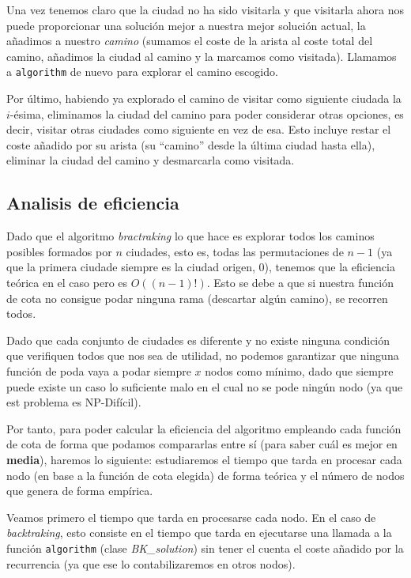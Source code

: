 \documentclass{article}
\begin{document}


Una vez tenemos claro que la ciudad no ha sido visitarla y que visitarla ahora nos puede proporcionar una solución mejor a nuestra mejor solución actual, la añadimos a nuestro \textit{camino} (sumamos el coste de la arista al coste total del camino, añadimos la ciudad al camino y la marcamos como visitada). Llamamos a \verb|algorithm| de nuevo para explorar el camino escogido.



Por último, habiendo ya explorado el camino de visitar como siguiente ciudada la $i$-ésima, eliminamos la ciudad del camino para poder considerar otras opciones, es decir, visitar otras ciudades como siguiente en vez de esa. Esto incluye restar el coste añadido por su arista (su ``camino'' desde la última ciudad hasta ella), eliminar la ciudad del camino y desmarcarla como visitada.

\subsection{Analisis de eficiencia}

Dado que el algoritmo \textit{bractraking} lo que hace es explorar todos los caminos posibles formados por $n$ ciudades, esto es, todas las permutaciones de $n-1$ (ya que la primera ciudade siempre es la ciudad origen, 0), tenemos que la eficiencia teórica en el caso pero es $O((n-1)!)$. Esto se debe a que si nuestra función de cota no consigue podar ninguna rama (descartar algún camino), se recorren todos.

Dado que cada conjunto de ciudades es diferente y no existe ninguna condición que verifiquen todos que nos sea de utilidad, no podemos garantizar que ninguna función de poda vaya a podar siempre $x$ nodos como mínimo, dado que siempre puede existe un caso lo suficiente malo en el cual no se pode ningún nodo (ya que est problema es NP-Difícil).

Por tanto, para poder calcular la eficiencia del algoritmo empleando cada función de cota de forma que podamos compararlas entre sí (para saber cuál es mejor en \textbf{media}), haremos lo siguiente: estudiaremos el tiempo que tarda en procesar cada nodo (en base a la función de cota elegida) de forma teórica y el número de nodos que genera de forma empírica.

Veamos primero el tiempo que tarda en procesarse cada nodo. En el caso de \textit{backtraking}, esto consiste en el tiempo que tarda en ejecutarse una llamada a la función \verb|algorithm| (clase \textit{BK\_solution}) sin tener el cuenta el coste añadido por la recurrencia (ya que ese lo contabilizaremos en otros nodos).
\end{document}

